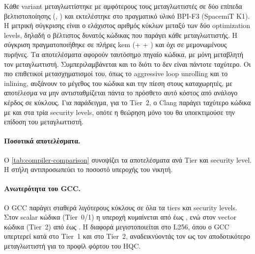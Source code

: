 Κάθε variant μεταγλωττίστηκε με αμφότερους τους μεταγλωττιστές σε δύο
επίπεδα βελτιστοποίησης (, ) και
εκτελέστηκε στο πραγματικό υλικό BPI-F3 (SpacemiT K1). Η μετρική σύγκρισης είναι ο ελάχιστος
αριθμός κύκλων μεταξύ των δύο optimization levels, δηλαδή ο βέλτιστος
δυνατός κώδικας που παράγει κάθε μεταγλωττιστής.
Η σύγκριση πραγματοποιήθηκε σε πλήρες \gls{kem} (\KeyGen + \Encaps +
\Decaps) και όχι σε μεμονωμένους πυρήνες. Τα αποτελέσματα αφορούν ταυτόσημο
πηγαίο κώδικα, με μόνη μεταβλητή τον μεταγλωττιστή.
Συμπεριλαμβάνεται και το  διότι το  δεν είναι πάντοτε ταχύτερο.
Οι πιο επιθετικοί μετασχηματισμοί του, όπως το aggressive loop unrolling και το
inlining, αυξάνουν το μέγεθος του κώδικα και την πίεση στους καταχωρητές, με
αποτέλεσμα να μην αντισταθμίζεται πάντα το πρόσθετο αυτό κόστος από ανάλογο κέρδος 
σε κύκλους. Για παράδειγμα, για το Tier~2, ο Clang παράγει ταχύτερο κώδικα με 
και στα τρία security levels, οπότε η θεώρηση μόνο του  θα
υποεκτιμούσε την επίδοση του μεταγλωττιστή.

\paragraph{Ποσοτικά αποτελέσματα.}

Ο \cref{tab:compiler-comparison} συνοψίζει τα αποτελέσματα ανά Tier
και security level. Η στήλη  αντιπροσωπεύει το ποσοστό
υπεροχής του νικητή.

\begin{table}[htbp]
  \centering
  \captionsetup{list=no}
  \caption{Συγκριτική αξιολόγηση Clang vs GCC (πλήρες \KEM, BPI-F3, $\VLEN = \num{256}$).}
  \label{tab:compiler-comparison}
  \small
  
\end{table}

\paragraph{Ανωτερότητα του GCC.}
Ο GCC παράγει σταθερά λιγότερους κύκλους σε όλα τα tiers και security levels.
Στον scalar κώδικα (Tier~0/1) η υπεροχή κυμαίνεται από  έως ,
ενώ στον vector κώδικα (Tier~2) από  έως . Η διαφορά
μεγιστοποιείται στο L256, όπου ο GCC υπερτερεί κατά  στο Tier~1 και
 στο Tier~2, αναδεικνύοντάς τον ως τον αποδοτικότερο μεταγλωττιστή για
το προφίλ φόρτου του HQC.

